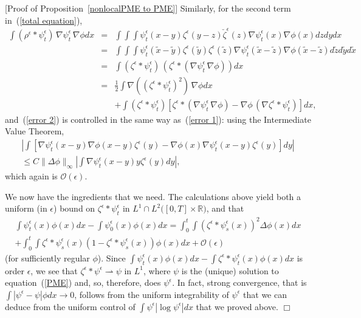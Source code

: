 \documentclass[12pt]{article}
\newenvironment {proof}{{\noindent\bf Proof }}{\hfill $\Box$ \medskip}
\def \tilde{\widetilde}
\newcommand{\IR}{\mathbb R}
\numberwithin{equation}{section}
\begin{document}
\begin{proof}[Proof of Proposition~\ref{nonlocalPME to PME}]
Similarly, for the second term in~(\ref{total equation}),
\begin{eqnarray}
\nonumber
\int (\rho^{\epsilon}*\psi_t^\epsilon)\, \nabla \psi_t^\epsilon\, \nabla\phi dx
&=&
\int\int\int \psi_t^\epsilon(x-y)\zeta^{\epsilon}(y-z)
\check{\zeta}^{\epsilon}(z)\nabla \psi_t^\epsilon(x)\nabla\phi(x) dz dy  dx
\\
\nonumber
&=&
\int\int\int \psi_t^\epsilon(\tilde{x}-\tilde{y})\zeta^{\epsilon}(\tilde{y})
\zeta^{\epsilon}(\tilde{z})\nabla \psi_t^\epsilon(\tilde{x}-\tilde{z})
\nabla\phi(\tilde{x}-\tilde{z}) d \tilde{z} d\tilde{y} d\tilde{x}
\\
\nonumber
	&=&\int(\zeta^{\epsilon}*\psi_t^\epsilon)\,
\left(\zeta^{\epsilon}*(\nabla \psi_t^\epsilon \, \nabla\phi)\right)  dx\\
\nonumber
&=&
\frac{1}{2}\int\nabla ((\zeta^{\epsilon}*\psi_t^\epsilon)^2)
\, \nabla\phi  dx
\\
\label{error 2}
&&+
\int (\zeta^{\epsilon}*\psi_t^\epsilon)
\left[\zeta^{\epsilon}*(\nabla \psi_t^\epsilon\, \nabla\phi)-
\nabla\phi\,(\nabla \zeta^{\epsilon}*\psi_t^\epsilon)\right] dx,
\end{eqnarray}
and~(\ref{error 2}) is controlled in the same way as~(\ref{error 1}):
using the Intermediate Value Theorem,
\begin{multline*}
\left|\int\left[\nabla \psi_t^\epsilon(x-y)\nabla\phi(x-y)\zeta^{\epsilon}(y)
-\nabla\phi(x)\nabla \psi_t^\epsilon(x-y)\zeta^{\epsilon}(y)
\right] dy\right|
\\
\leq C\|\Delta\phi\|_\infty\left|\int \nabla \psi_t^\epsilon(x-y)
y \zeta^{\epsilon}(y)
d y\right|,
\end{multline*}
which again is $\mathcal{O}(\epsilon)$.

We now have the ingredients that we need.
The calculations above yield both a uniform (in $\epsilon$) bound on
$\zeta^{\epsilon}*\psi_t^\epsilon$ in
$L^1\cap L^2\big([0,T]\times \IR\big)$, and that
\begin{multline}
\int \psi_t^\epsilon(x)\phi(x) dx-\int \psi_0^\epsilon (x)\phi(x) dx
	=\int_0^t\int (\zeta^{\epsilon}*\psi_s^\epsilon(x))^2\Delta\phi(x) dx
\\
	+\int_0^t \int \zeta^{\epsilon}*\psi_s^\epsilon(x)
	\left(1- \zeta^{\epsilon}*\psi_s^\epsilon(x)\right)
\phi(x) dx
+\mathcal{O}(\epsilon)
\end{multline}
(for sufficiently regular $\phi$). Since
$\int \psi_t^\epsilon(x)\phi(x) d x-
\int \zeta^{\epsilon}*\psi_t^\epsilon (x)\phi(x) d x$ is order $\epsilon$, we see
that $\zeta^{\epsilon}*\psi^\epsilon\rightharpoonup \psi$ in $L^1$, where $\psi$ is the (unique)
solution
to equation~(\ref{PME})
and, so, therefore, does $\psi^\epsilon$. In fact, strong convergence, that is
$\int |\psi^\epsilon -\psi|\phi dx \to 0$, follows from the
uniform integrability of $\psi^\epsilon$ that we
can deduce from the uniform control of
$\int \psi^\epsilon|\log \psi^\epsilon| d x$ that we proved above.
\end{proof}
\end{document}
